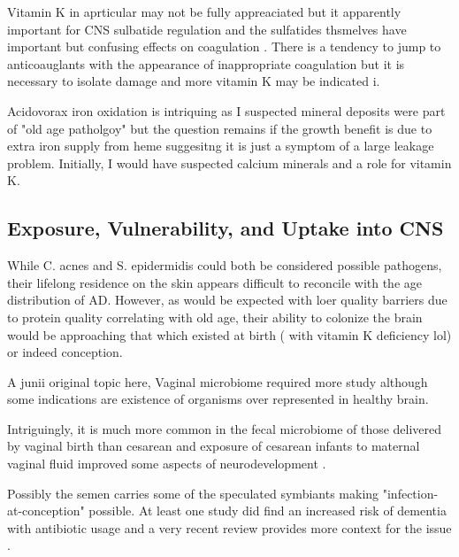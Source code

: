 \documentclass[aps,secnumarabic,balancelastpage,amsmath,amssymb,nofootinbib]{revtex4}
\begin{document}
Vitamin K in aprticular may not be fully appreaciated but
it apparently important for CNS sulbatide regulation
\cite{PMID8914944}
\cite{PMC6110503}
and the sulfatides thsmelves have important but confusing effects
on coagulation \cite{Kyogashima2001}.
There is a tendency to jump to anticoauglants with the
appearance of inappropriate coagulation but it is necessary
to isolate damage and more vitamin K may be indicated
i\cite{marchywka-MJM-2022-015-0.20c}.


Acidovorax iron oxidation  is intriquing as I suspected mineral deposits were part
of "old age patholgoy" but the question remains if the growth
benefit is due to extra iron supply from heme suggesitng
it is just a symptom of a large leakage problem. Initially, 
I would have suspected calcium minerals and a role for vitamin K.
 
\subsection{Exposure, Vulnerability, and Uptake into CNS }


While C. acnes and S. epidermidis could both
be considered possible pathogens, their lifelong
residence on the skin appears difficult to
reconcile with the age distribution of AD.
However, as would be expected with loer quality
barriers due to protein quality correlating
with old age, their ability to colonize
the brain would be approaching that
which existed at birth ( with vitamin K deficiency lol)
 or indeed conception.



A junii original topic here, 
Vaginal microbiome required more study although some
indications are existence of organisms over represented
in healthy brain. 

Intriguingly, it is much more common in the fecal microbiome of
those delivered by vaginal
birth than cesarean \cite{Pandey2012}
and exposure of cesarean infants to maternal vaginal fluid
improved some aspects of neurodevelopment 
\cite{Zhou_Qiu_Wang_Effects_vaginal_microbiota_2023}.



Possibly the semen carries some of the speculated symbiants
\cite{Koort_Sosa_Turk_Lactobacillus_crispatus_2023}
\cite{10.3389/fcimb.2022.815786}
making "infection-at-conception" possible. 
At least one study did find an increased risk of dementia with
antibiotic usage
\cite{10.3389/fphar.2022.888333}
and a very recent review provides more context for the issue
\cite{KarenMOttemann_2023}.
\end{document}
